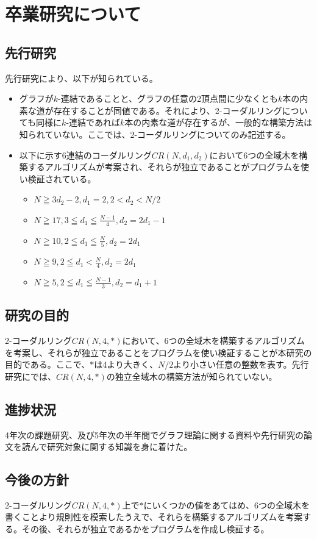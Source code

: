 \documentclass[twocolumn, 11pt]{jsarticle}
\begin{document}
\section{卒業研究について}
    \subsection{先行研究}
        先行研究により、以下が知られている。
        \begin{itemize}
            \item グラフが$k$-連結であることと、グラフの任意の2頂点間に少なくとも$k$本の内素な道が存在することが同値である\cite{YukihiroHAMADA2016}。それにより、2-コーダルリングについても同様に$k$-連結であれば$k$本の内素な道が存在するが、一般的な構築方法は知られていない。ここでは、2-コーダルリングについてのみ記述する。
            \item 以下に示す6連結のコーダルリング$CR(N,d_1,d_2)$において6つの全域木を構築するアルゴリズムが考案され、それらが独立であることがプログラムを使い検証されている\cite{Yokooji}。
                \begin{itemize}
                    \item $N\geqq3d_2-2, d_1=2, 2<d_2<N/2$
                    \item $N\geqq17, 3\leqq d_1\leqq\frac{N-1}{4}, d_2=2d_1-1$
                    \item $N\geqq10, 2\leqq d_1\leqq\frac{N}{5}, d_2=2d_1$
                    \item $N\geqq9, 2\leqq d_1<\frac{N}{4}, d_2=2d_1$
                    \item $N\geqq5, 2\leqq d_1\leqq\frac{N-1}{3}, d_2=d_1+1$
                \end{itemize}
        \end{itemize}
        
    \subsection{研究の目的}
        2-コーダルリング$CR(N, 4, *)$において、6つの全域木を構築するアルゴリズムを考案し、それらが独立であることをプログラムを使い検証することが本研究の目的である。ここで、$*$は4より大きく、$N/2$より小さい任意の整数を表す。先行研究にでは、$CR(N, 4, *)$の独立全域木の構築方法が知られていない。

    \subsection{進捗状況}
        4年次の課題研究、及び5年次の半年間でグラフ理論に関する資料や先行研究の論文を読んで研究対象に関する知識を身に着けた。

    \subsection{今後の方針}
        2-コーダルリング$CR(N,4,*)$上で$*$にいくつかの値をあてはめ、6つの全域木を書くことより規則性を模索したうえで、それらを構築するアルゴリズムを考案する。その後、それらが独立であるかをプログラムを作成し検証する。
    
    


\end{document}
